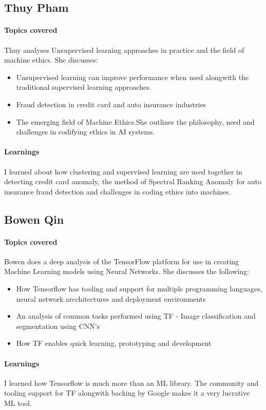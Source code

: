 \documentclass{article}
\begin{document}
		\subsection{Thuy Pham}
			\paragraph{Topics covered}
			Thuy analyses Unsupervised learning approaches in practice and the field of machine ethics. She discusses:
			\begin{itemize}
				\item Unsupervised learning can improve performance when used alongwith the traditional supervised learning approaches.
				\item Fraud detection in credit card and auto insurance industries
				\item The emerging field of Machine Ethics.She outlines the philosophy, need and challenges in codifying ethics in AI systems.
			\end{itemize}  
			\paragraph{Learnings}
			I learned about how clustering and supervised learning are used together in detecting credit card anomaly,
			the method of Spectral Ranking Anomaly for auto insurance fraud detection and challenges in coding ethics into machines.

		\subsection{Bowen Qin}
			\paragraph{Topics covered}
			Bowen does a deep analysis of the TensorFlow platform for use in creating Machine Learning models using Neural Networks. She discusses the following:
			\begin{itemize}
				\item How Tensorflow has tooling and support for multiple programming languages, neural network arcchitectures and deployment environments
				\item An analysis of common tasks performed using TF - Image classification and segmentation using CNN's
				\item How TF enables quick learning, prototyping and development
			\end{itemize}
			\paragraph{Learnings}
			I learned how Tensorflow is much more than an ML library. The community and tooling support for TF alongwith backing by Google makes it a very lucrative ML tool.
			
\end{document}

